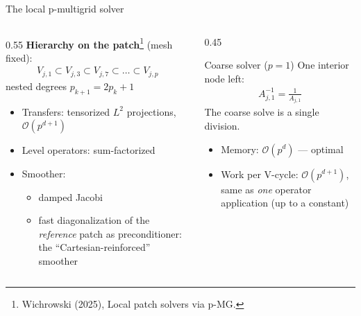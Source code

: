 \documentclass{beamer}
\begin{document}
\begin{frame}{The local p-multigrid solver}
    \begin{columns}[T]
        \begin{column}{0.55\textwidth}
            \textbf{Hierarchy on the patch}\footnote{Wichrowski (2025), Local patch solvers via p-MG.} (mesh fixed):
            \begin{gather*}
                V_{j,1} \subset V_{j,3} \subset V_{j,7} \subset \dots \subset V_{j,p}
            \end{gather*}
            nested degrees $p_{k+1} = 2p_k + 1$
            \begin{itemize}
                \item Transfers: tensorized $L^2$ projections,\\ $\mathcal O(p^{d+1})$
                \item Level operators: sum-factorized
                \item Smoother:
                      \begin{itemize}
                          \item damped Jacobi
                          \item fast diagonalization of the \emph{reference} patch as preconditioner:\\ the ``Cartesian-reinforced'' smoother
                      \end{itemize}
            \end{itemize}
        \end{column}
        \begin{column}{0.45\textwidth}
            \begin{block}{Coarse solver ($p=1$)}
                One interior node left:
                \begin{gather*}
                    A_{j,1}^{-1} = \frac{1}{A_{j,1}}
                \end{gather*}
                The coarse solve is \alert{a single division}.
            \end{block}
            \vspace{0.5em}
            \begin{itemize}
                \item Memory: $\mathcal O(p^d)$ --- optimal
                \item Work per V-cycle: $\mathcal O(p^{d+1})$,\\ same as \emph{one} operator application (up to a constant)
            \end{itemize}
        \end{column}
    \end{columns}
\end{frame}
\end{document}
